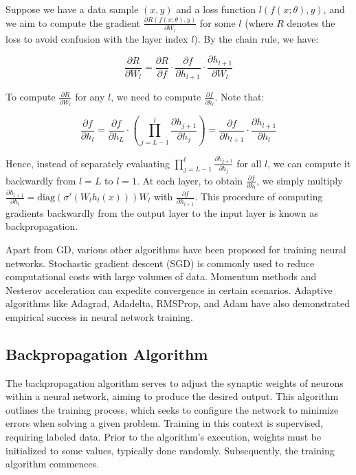 \documentclass[a4paper]{report}
\begin{document}
{Suppose we have a data sample $(x, y)$ and a loss function $l(f(x; \theta), y)$, and we aim to compute the gradient $\frac{\partial R(f(x; \theta), y)}{\partial W_l}$ for some $l$ (where $R$ denotes the loss to avoid confusion with the layer index $l$). By the chain rule, we have:

\[
\frac{\partial R}{\partial W_l} = \frac{\partial R}{\partial f} \cdot \frac{\partial f}{\partial h_{l+1}} \cdot \frac{\partial h_{l+1}}{\partial W_l}
\]

To compute $\frac{\partial R}{\partial W_l}$ for any $l$, we need to compute $\frac{\partial f}{\partial h_l}$. Note that:

\[
\frac{\partial f}{\partial h_l} = \frac{\partial f}{\partial h_L} \cdot \left(\prod_{j=L-1}^{l} \frac{\partial h_{j+1}}{\partial h_j}\right) = \frac{\partial f}{\partial h_{l+1}} \cdot \frac{\partial h_{l+1}}{\partial h_l}
\]

Hence, instead of separately evaluating $\prod_{j=L-1}^{l} \frac{\partial h_{j+1}}{\partial h_j}$ for all $l$, we can compute it backwardly from $l = L$ to $l = 1$. At each layer, to obtain $\frac{\partial f}{\partial h_l}$, we simply multiply $\frac{\partial h_{l+1}}{\partial h_l} = \text{diag}(\sigma'(W_l h_l(x))) W_l$ with $\frac{\partial f}{\partial h_{l+1}}$. This procedure of computing gradients backwardly from the output layer to the input layer is known as backpropagation.

Apart from GD, various other algorithms have been proposed for training neural networks. Stochastic gradient descent (SGD) is commonly used to reduce computational costs with large volumes of data. Momentum methods and Nesterov acceleration can expedite convergence in certain scenarios. Adaptive algorithms like Adagrad, Adadelta, RMSProp, and Adam have also demonstrated empirical success in neural network training.

\subsection{Backpropagation Algorithm}
The backpropagation algorithm serves to adjust the synaptic weights of neurons within a neural network, aiming to produce the desired output. This algorithm outlines the training process, which seeks to configure the network to minimize errors when solving a given problem. Training in this context is supervised, requiring labeled data. Prior to the algorithm's execution, weights must be initialized to some values, typically done randomly. Subsequently, the training algorithm commences.

}
\end{document}

